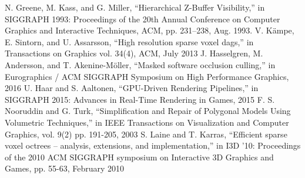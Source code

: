 \documentclass[conference]{IEEEtran}
\begin{document}
\begin{acronym}[SPS] %

\end{acronym}

\begin{thebibliography}{00}
 N. Greene, M. Kass, and G. Miller, ``Hierarchical Z-Buffer Visibility,'' in SIGGRAPH 1993: Proceedings of the 20th Annual Conference on Computer Graphics and Interactive Techniques, ACM, pp. 231–238, Aug. 1993.
 V. Kämpe, E. Sintorn, and U. Assarsson, ``High resolution sparse voxel dags,'' in Transactions on Graphics vol. 34(4), ACM, July 2013
 J. Hasselgren, M. Andersson, and T. Akenine-Möller, ``Masked software occlusion culling,'' in Eurographics / ACM SIGGRAPH Symposium on High Performance Graphics, 2016
 U. Haar and S. Aaltonen, ``GPU-Driven Rendering Pipelines,'' in SIGGRAPH 2015: Advances in Real-Time Rendering in Games, 2015
 F. S. Nooruddin and G. Turk, ``Simplification and Repair of Polygonal Models Using Volumetric Techniques,'' in IEEE Transactions on Visualization and Computer Graphics, vol. 9(2) pp. 191-205, 2003
 S. Laine and T. Karras, ``Efficient sparse voxel octrees – analysis, extensions, and implementation,'' in I3D '10: Proceedings of the 2010 ACM SIGGRAPH symposium on Interactive 3D Graphics and Games, pp. 55-63, February 2010
\end{thebibliography}
\vspace{12pt}
\end{document}
